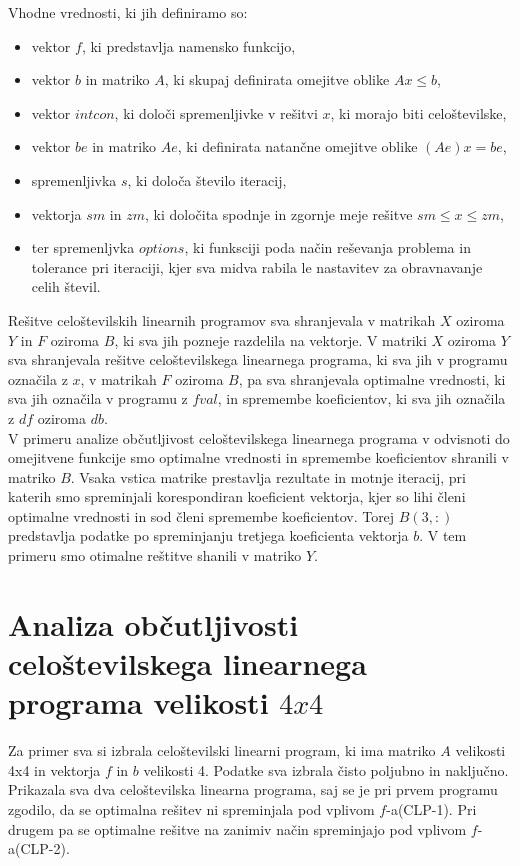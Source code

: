\documentclass[a4paper,12pt]{article}
\begin{document}
Vhodne vrednosti, ki jih definiramo so:
\begin{itemize}
\item vektor $f$, ki predstavlja namensko funkcijo,
\item vektor $b$ in matriko $A$, ki skupaj definirata omejitve oblike $Ax \leq b$,
\item vektor $intcon$, ki določi spremenljivke v rešitvi $x$, ki morajo biti celoštevilske,
\item vektor $be$ in matriko $Ae$, ki definirata natančne omejitve oblike $(Ae)x=be$,
\item spremenljivka $s$, ki določa število iteracij,
\item vektorja $sm$ in $zm$, ki določita spodnje in zgornje meje rešitve $sm \leq x \leq zm$,
\item ter spremenljvka $options$, ki funksciji poda način reševanja problema in tolerance pri iteraciji, kjer sva midva rabila le nastavitev za obravnavanje celih števil.
\end{itemize}


Rešitve celoštevilskih linearnih programov sva shranjevala v matrikah $X$ oziroma $Y$ in $F$ oziroma $B$, ki sva jih pozneje razdelila na vektorje. V matriki $X$ oziroma $Y$ sva shranjevala rešitve celoštevilskega linearnega programa, ki sva jih v programu označila z $x$, v matrikah $F$ oziroma $B$, pa sva shranjevala optimalne vrednosti, ki sva jih označila v programu z $fval$, in spremembe koeficientov, ki sva jih označila z $df$ oziroma $db$.
\\[0.5cm]
V primeru analize občutljivost celoštevilskega linearnega programa v odvisnoti do omejitvene funkcije smo optimalne vrednosti in spremembe koeficientov shranili v matriko $B$. Vsaka vstica matrike prestavlja rezultate in motnje iteracij, pri katerih smo spreminjali korespondiran koeficient vektorja,  kjer so lihi členi optimalne vrednosti in sod členi spremembe koeficientov. Torej $B(3,:)$ predstavlja podatke po spreminjanju tretjega koeficienta vektorja $b$. V tem primeru smo otimalne reštitve shanili v matriko $Y$.


\section{Analiza občutljivosti celoštevilskega linearnega programa velikosti $4x4$}

Za primer sva si izbrala celoštevilski linearni program, ki ima matriko $A$ velikosti 4x4 in vektorja $f$ in $b$ velikosti 4. Podatke sva izbrala čisto poljubno in naključno. Prikazala sva dva celoštevilska linearna programa, saj se je pri prvem programu zgodilo, da se optimalna rešitev ni spreminjala pod vplivom $f$-a(CLP-1). Pri drugem pa se optimalne rešitve na zanimiv način spreminjajo pod vplivom $f$-a(CLP-2).
\end{document}
